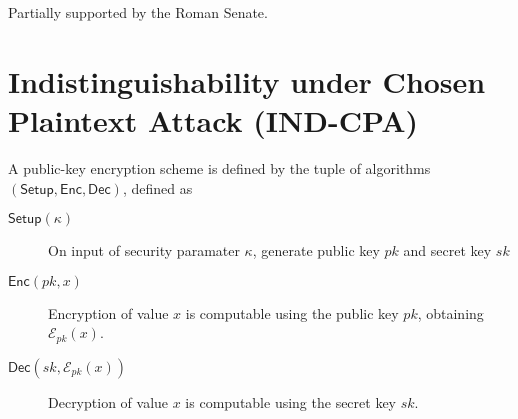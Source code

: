 \documentclass[twocolumn]{autart}
\theoremstyle{definition}
\theoremstyle{remark}
\begin{document}
\begin{ack}                               %
Partially supported by the Roman Senate.  %
\end{ack}





\appendix
\section{Indistinguishability under Chosen Plaintext Attack (IND-CPA)} \label{app:ind_cpa}
A public-key encryption scheme is defined by the tuple of algorithms $(\mathsf{Setup}, \mathsf{Enc}, \mathsf{Dec})$, defined as
\begin{description}
    \item[$\mathsf{Setup}(\kappa)$] On input of security paramater $\kappa$, generate public key $pk$ and secret key $sk$
    \item[$\mathsf{Enc}(pk, x)$] Encryption of value $x$ is computable using the public key $pk$, obtaining $\mathcal{E}_{pk}(x)$.
    \item[$\mathsf{Dec}(sk, \mathcal{E}_{pk}(x))$] Decryption of value $x$ is computable using the secret key $sk$.
\end{description}
\end{document}
